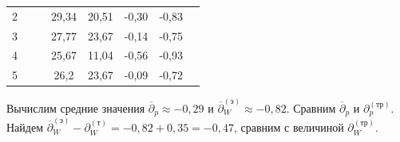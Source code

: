 \documentclass[12pt]{article}
\begin{document}
\begin{enumerate}
\begin{table}[h!]
\begin{center}
\begin{tabular}{|c|c|c|c|c|c|c|c|}
 2 &    &  & 	29,34	 &20,51 &	-0,30	 &-0,83&\\
\hhline{-~~----~}
 3 &   &  &27,77	 &23,67	 &-0,14	 &-0,75& \\
\hhline{-~~----~}
 4 &  &  &25,67	 &11,04	 &-0,56	 &-0,93&	\\
\hhline{-~~----~}
 5 &    &  &26,2 &	23,67 &	-0,09 &	-0,72 &	 \\
\hline
\end{tabular}
\end{center}
\end{table}

Вычислим средние значения $\overline{\partial}_{p}\approx-0,29$ и $\overline{\partial}^{(э)}_{W}\approx-0,82$. Сравним
$\overline{\partial}_{p}$ и $\partial^{(тр)}_{p}$. Найдем $\overline{\partial}^{(э)}_{W} - \partial^{(т)}_{W} = -0,82+0,35=-0,47$, сравним с величиной $\partial^{(тр)}_{W}$.
\end{enumerate}
\newpage
\end{document}
